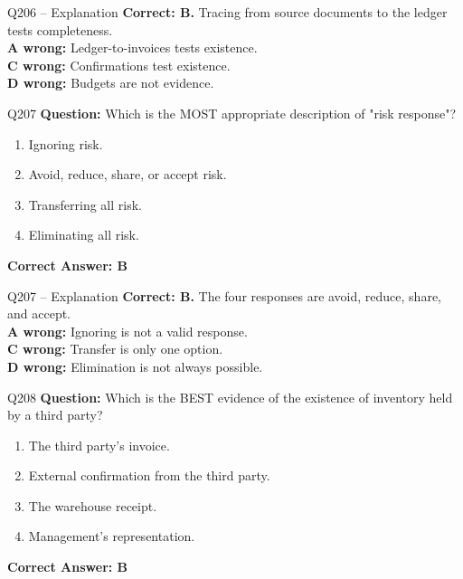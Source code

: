 \documentclass[aspectratio=169,10pt]{beamer}
\begin{document}
	\begin{frame}[t]{Q206 -- Explanation}
		\small
		\textbf{Correct: B.} Tracing from source documents to the ledger tests completeness. \\[4pt]
		\textbf{A wrong:} Ledger-to-invoices tests existence. \\[2pt]
		\textbf{C wrong:} Confirmations test existence. \\[2pt]
		\textbf{D wrong:} Budgets are not evidence.
	\end{frame}
	
	\begin{frame}[t]{Q207}
		\small
		\textbf{Question:} Which is the MOST appropriate description of "risk response"?
		\begin{enumerate}[label=\Alph*.,itemsep=1pt,topsep=2pt]
			\item Ignoring risk.
			\item Avoid, reduce, share, or accept risk.
			\item Transferring all risk.
			\item Eliminating all risk.
		\end{enumerate}
		\vspace{4pt}
		\textbf{Correct Answer: B}
	\end{frame}
	
	\begin{frame}[t]{Q207 -- Explanation}
		\small
		\textbf{Correct: B.} The four responses are avoid, reduce, share, and accept. \\[4pt]
		\textbf{A wrong:} Ignoring is not a valid response. \\[2pt]
		\textbf{C wrong:} Transfer is only one option. \\[2pt]
		\textbf{D wrong:} Elimination is not always possible.
	\end{frame}
	
	\begin{frame}[t]{Q208}
		\small
		\textbf{Question:} Which is the BEST evidence of the existence of inventory held by a third party?
		\begin{enumerate}[label=\Alph*.,itemsep=1pt,topsep=2pt]
			\item The third party's invoice.
			\item External confirmation from the third party.
			\item The warehouse receipt.
			\item Management's representation.
		\end{enumerate}
		\vspace{4pt}
		\textbf{Correct Answer: B}
	\end{frame}
	
\end{document}
